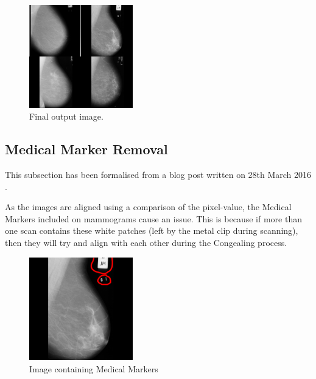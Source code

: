 \begin{figure}[H]
  \centering
  \includegraphics[width=0.4\textwidth]{Chapter2/technical-img/big_scan.jpg}
  \caption{Final output image.}
  \label{fig:final-output-4}
\end{figure}

\subsection{Medical Marker Removal}

This subsection has been formalised from a blog post written on 28th March 2016 \cite{Collins_2016}.

As the images are aligned using a comparison of the pixel-value, the Medical Markers included on mammograms cause an issue. This is because if more than one scan contains these white patches (left by the metal clip during scanning), then they will try and align with each other during the \Gls{Congealing} process.

\begin{figure}[H]
  \centering
  \includegraphics[width=0.4\textwidth]{Chapter2/technical-img/mdb196.png}
  \caption{Image containing Medical Markers}
  \label{fig:med-markers}
\end{figure}

